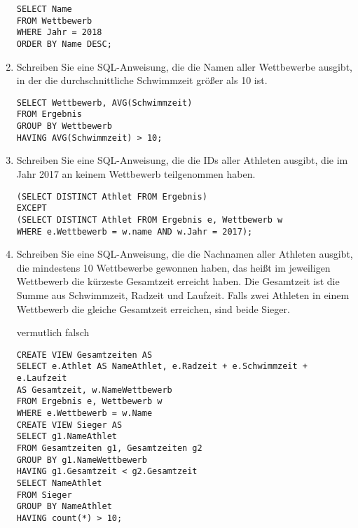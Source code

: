 \documentclass{lehramt-informatik-aufgabe}
\begin{document}
\begin{enumerate}
\begin{liAntwort}
\begin{verbatim}
SELECT Name
FROM Wettbewerb
WHERE Jahr = 2018
ORDER BY Name DESC;
\end{verbatim}
\end{liAntwort}


\item Schreiben Sie eine SQL-Anweisung, die die Namen aller Wettbewerbe
ausgibt, in der die durchschnittliche Schwimmzeit größer als 10 ist.

\begin{liAntwort}
\begin{verbatim}
SELECT Wettbewerb, AVG(Schwimmzeit)
FROM Ergebnis
GROUP BY Wettbewerb
HAVING AVG(Schwimmzeit) > 10;
\end{verbatim}
\end{liAntwort}


\item Schreiben Sie eine SQL-Anweisung, die die IDs aller Athleten
ausgibt, die im Jahr 2017 an keinem Wettbewerb teilgenommen haben.

\begin{liAntwort}
\begin{verbatim}
(SELECT DISTINCT Athlet FROM Ergebnis)
EXCEPT
(SELECT DISTINCT Athlet FROM Ergebnis e, Wettbewerb w
WHERE e.Wettbewerb = w.name AND w.Jahr = 2017);
\end{verbatim}
\end{liAntwort}


\item Schreiben Sie eine SQL-Anweisung, die die Nachnamen aller Athleten
ausgibt, die mindestens 10 Wettbewerbe gewonnen haben, das heißt im
jeweiligen Wettbewerb die kürzeste Gesamtzeit erreicht haben. Die
Gesamtzeit ist die Summe aus Schwimmzeit, Radzeit und Laufzeit. Falls
zwei Athleten in einem Wettbewerb die gleiche Gesamtzeit erreichen, sind
beide Sieger.

\begin{liAntwort}
vermutlich falsch
\begin{verbatim}
CREATE VIEW Gesamtzeiten AS
SELECT e.Athlet AS NameAthlet, e.Radzeit + e.Schwimmzeit + e.Laufzeit
AS Gesamtzeit, w.NameWettbewerb
FROM Ergebnis e, Wettbewerb w
WHERE e.Wettbewerb = w.Name
CREATE VIEW Sieger AS
SELECT g1.NameAthlet
FROM Gesamtzeiten g1, Gesamtzeiten g2
GROUP BY g1.NameWettbewerb
HAVING g1.Gesamtzeit < g2.Gesamtzeit
SELECT NameAthlet
FROM Sieger
GROUP BY NameAthlet
HAVING count(*) > 10;
\end{verbatim}
\end{liAntwort}


\end{enumerate}
\end{document}
